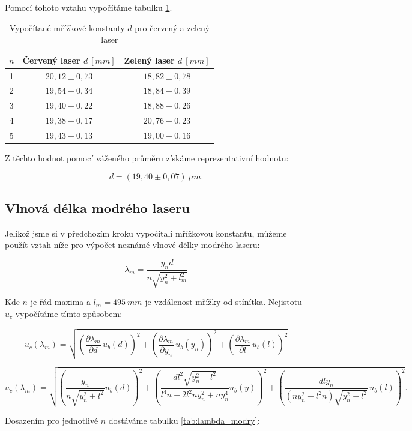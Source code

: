 \documentclass[a4paper,12pt]{article}
\begin{document}
Pomocí tohoto vztahu vypočítáme tabulku \ref{tab:mrizkova_konstanta}.

\begin{table}[H]
\centering
\renewcommand{\arraystretch}{1.5}
\begin{tabular}{|c|c|c|}
\hline
$n$ &
\textbf{Červený laser} $d\ \unit{[mm]}$&
\textbf{Zelený laser} $d\ \unit{[mm]}$\\
\hline
1 & $20{,}12 \pm 0{,}73$ & $18{,}82 \pm 0{,}78$ \\
\hline
2 & $19{,}54 \pm 0{,}34$ & $18{,}84 \pm 0{,}39$ \\
\hline
3 & $19{,}40 \pm 0{,}22$ & $18{,}88 \pm 0{,}26$ \\
\hline
4 & $19{,}38 \pm 0{,}17$ & $20{,}76 \pm 0{,}23$ \\
\hline
5 & $19{,}43 \pm 0{,}13$ & $19{,}00 \pm 0{,}16$ \\
\hline
\end{tabular}
\caption{Vypočítané mřížkové konstanty $d$ pro červený a zelený laser}
\label{tab:mrizkova_konstanta}
\end{table}

Z těchto hodnot pomocí váženého průměru získáme reprezentativní hodnotu:

$$
d=(19,40\pm 0,07)\ \unit{\mu m}.
$$

\subsection{Vlnová délka modrého laseru}
Jelikož jsme si v předchozím kroku vypočítali mřížkovou konstantu, můžeme použít vztah níže pro výpočet neznámé vlnové délky modrého laseru:

$$
\lambda_m = \frac{y_nd}{n\sqrt{y_n^2+l_m^2}}
$$

Kde $n$ je řád maxima a $l_m = 495\ \unit{mm}$ je vzdálenost mřížky od stínítka. Nejistotu $u_c$ vypočítáme tímto způsobem:

$$
u_c(\lambda_m) =
\sqrt{
\left(\frac{\partial \lambda_m}{\partial d}\,u_b(d)\right)^2
+
\left(\frac{\partial \lambda_m}{\partial y_n}\,u_b(y_n)\right)^2
+
\left(\frac{\partial \lambda_m}{\partial l}\,u_b(l)\right)^2
}
$$

$$
u_c(\lambda_m) =
\sqrt{
\left(
\frac{y_n}{n\sqrt{y_n^2 + l^2}}u_b(d)
\right)^2
+
\left(
\frac{d l^2 \sqrt{y_n^2 + l^2}}{l^4 n + 2 l^2 n y_n^2 + n y_n^4}u_b(y)
\right)^2
+
\left(
\frac{d l y_n}{(n y_n^2 + l^2 n)\sqrt{y_n^2 + l^2}}\,u_b(l)
\right)^2
}.
$$

Dosazením pro jednotlivé $n$ dostáváme tabulku \ref{tab:lambda_modry}:
\end{document}
